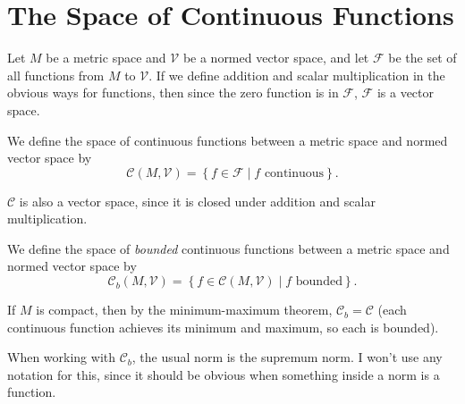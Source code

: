 \documentclass[twoside,10pt]{report}
\begin{document}

\section{The Space of Continuous Functions}

Let $M$ be a metric space and $\mathcal{V}$ be a normed vector space, and let $\mathcal{F}$ be the set of all functions from $M$ to $\mathcal{V}$. If we define addition and scalar multiplication in the obvious ways for functions, then since the zero function is in $\mathcal{F}$, $\mathcal{F}$ is a vector space.

\begin{defn}[]
We define the space of continuous functions between a metric space and normed vector space by
\[
	\mathcal{C}(M,\mathcal{V}) = \left\{ f \in \mathcal{F} \;|\; f \text{ continuous} \right\}.
\] 
\end{defn}

$\mathcal{C}$ is also a vector space, since it is closed under addition and scalar multiplication.

\begin{defn}[]
We define the space of \textit{bounded} continuous functions between a metric space and normed vector space by
\[
	\mathcal{C}_b(M, \mathcal{V}) = \left\{ f \in \mathcal{C}(M, \mathcal{V}) \;|\; f \text{ bounded} \right\}.
\] 
\end{defn}

If $M$ is compact, then by the minimum-maximum theorem, $\mathcal{C}_b = \mathcal{C}$ (each continuous function achieves its minimum and maximum, so each is bounded).

When working with $\mathcal{C}_b$, the usual norm is the supremum norm. I won't use any notation for this, since it should be obvious when something inside a norm is a function.
\end{document}
